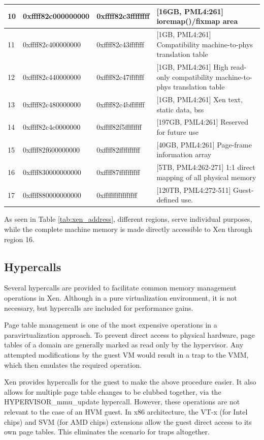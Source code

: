 \begin{longtable}{|m{2ex}|m{20ex}|m{18ex}|m{}|}
    \hline
    10 & 0xffff82c000000000  & 0xffff82c3ffffffff & [16GB, PML4:261] ioremap()/fixmap area \\
    \hline
    11 & 0xffff82c400000000  & 0xffff82c43fffffff & [1GB, PML4:261] Compatibility machine-to-phys translation table \\
    \hline
    12 & 0xffff82c440000000  & 0xffff82c47fffffff & [1GB, PML4:261] High read-only compatibility machine-to-phys translation table \\
    \hline
    13 & 0xffff82c480000000  & 0xffff82c4bfffffff & [1GB, PML4:261] Xen text, static data, bss \\
    \hline
    14 & 0xffff82c4c0000000  & 0xffff82f5ffffffff & [197GB, PML4:261] Reserved for future use \\
    \hline
    15 & 0xffff82f600000000  & 0xffff82ffffffffff & [40GB, PML4:261] Page-frame information array \\
    \hline
    16 & 0xffff830000000000  & 0xffff87ffffffffff & [5TB, PML4:262-271] 1:1 direct mapping of all physical memory\\
    \hline
    17 & 0xffff880000000000  & 0xffffffffffffffff & [120TB, PML4:272-511] Guest-defined use.  \\
\end{longtable}

As seen in Table \ref{tab:xen_address}, different regions, serve individual purposes, while the complete machine memory is made directly accessible to Xen through region 16. 

\subsection{Hypercalls}

Several hypercalls are provided to facilitate common memory management operations in Xen. Although in a pure virtualization environment, it is not necessary, but hypercalls are included for performance gains.

Page table management is one of the most expensive operations in a paravirtualization approach. To prevent direct access to physical hardware, page tables of a domain are generally marked as read only by the hypervisor. Any attempted modifications by the guest VM would result in a trap to the VMM, which then emulates the required operation.

Xen provides hypercalls for the guest to make the above procedure easier. It also allows for multiple page table changes to be clubbed together, via the HYPERVISOR\_mmu\_update hypercall. However, these operations are not relevant to the case of an HVM guest. In x86 architecture, the VT-x (for Intel chips) and SVM (for AMD chips) extensions allow the guest direct access to its own page tables. This eliminates the scenario for traps altogether.

